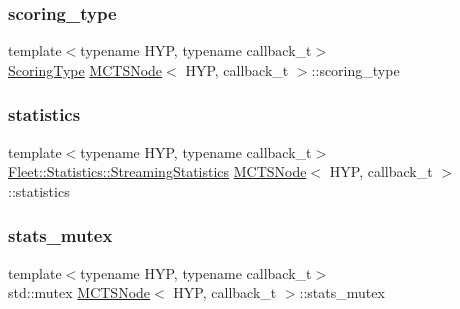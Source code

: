 \mbox{\label{class_m_c_t_s_node_a4bf717abcd090cc24d9a9d6452246c09}} 
\subsubsection{\texorpdfstring{scoring\+\_\+type}{scoring\_type}}
{\footnotesize\ttfamily template$<$typename H\+YP, typename callback\+\_\+t$>$ \\
\hyperlink{class_m_c_t_s_node_a5a201dc80c97c1b65503161f7e5603f6}{Scoring\+Type} \hyperlink{class_m_c_t_s_node}{M\+C\+T\+S\+Node}$<$ H\+YP, callback\+\_\+t $>$\+::scoring\+\_\+type}

\mbox{\label{class_m_c_t_s_node_af223a24db35d4f81d0ab73a42cb7e1bc}} 
\subsubsection{\texorpdfstring{statistics}{statistics}}
{\footnotesize\ttfamily template$<$typename H\+YP, typename callback\+\_\+t$>$ \\
\hyperlink{class_fleet_1_1_statistics_1_1_streaming_statistics}{Fleet\+::\+Statistics\+::\+Streaming\+Statistics} \hyperlink{class_m_c_t_s_node}{M\+C\+T\+S\+Node}$<$ H\+YP, callback\+\_\+t $>$\+::statistics}

\mbox{\label{class_m_c_t_s_node_a949477285b64ab1f84f81834f1a7ab0d}} 
\subsubsection{\texorpdfstring{stats\+\_\+mutex}{stats\_mutex}}
{\footnotesize\ttfamily template$<$typename H\+YP, typename callback\+\_\+t$>$ \\
std\+::mutex \hyperlink{class_m_c_t_s_node}{M\+C\+T\+S\+Node}$<$ H\+YP, callback\+\_\+t $>$\+::stats\+\_\+mutex\hspace{0.3cm}{\ttfamily [mutable]}}

\mbox{\label{class_m_c_t_s_node_a5bf1a60214369c7a5bc6b166dcdffe3d}} 
